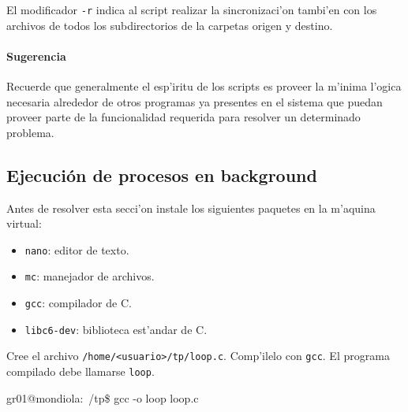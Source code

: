 El modificador \texttt{-r} indica al script realizar la sincronizaci'on tambi'en con los archivos de todos los
subdirectorios de la carpetas origen y destino.


\paragraph{Sugerencia}

Recuerde que generalmente el esp'iritu de los scripts es proveer la m'inima l'ogica necesaria alrededor de otros programas
ya presentes en el sistema que puedan proveer parte de la funcionalidad requerida para resolver un determinado problema.

\subsection{Ejecuci\'on de procesos en background}

Antes de resolver esta secci'on instale los siguientes paquetes en la m'aquina virtual:

\begin{itemize}
\item \texttt{nano}: editor de texto.
\item \texttt{mc}: manejador de archivos.
\item \texttt{gcc}: compilador de C.
\item \texttt{libc6-dev}: biblioteca est'andar de C.
\end{itemize}

Cree el archivo \texttt{/home/<usuario>/tp/loop.c}. Comp'ilelo con \texttt{gcc}. El programa compilado debe llamarse
\texttt{loop}.

\begin{envRespuesta}
gr01@mondiola:~/tp\$ gcc -o loop loop.c
\end{envRespuesta}


